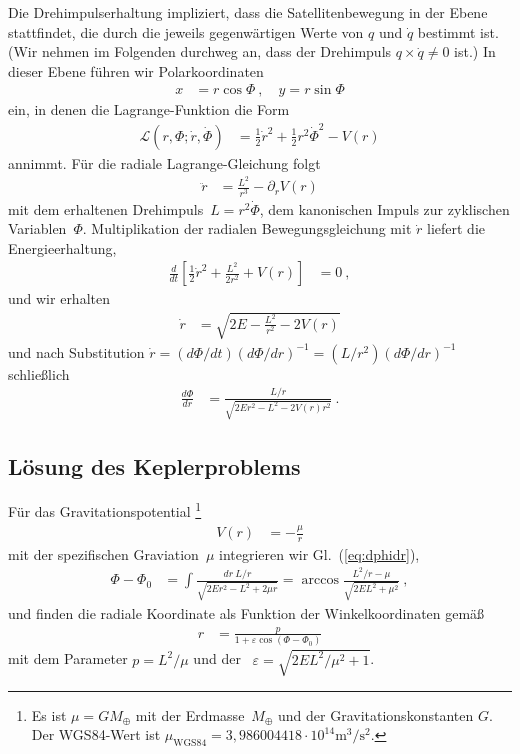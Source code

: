 \documentclass[10pt,a4paper]{article}
\newcommand{\mydef}[1]{\textls{#1}}
\begin{document}
Die Drehimpuls\-erhaltung impliziert, dass die Satellitenbewegung in der Ebene stattfindet, die durch die jeweils gegenwärtigen Werte von $q$ und $\dot{q}$ bestimmt ist.
(Wir nehmen im Folgenden durchweg an, dass der Drehimpuls $q\times\dot{q}\neq 0$ ist.)
In dieser Ebene führen wir Polarkoordinaten
\begin{align}
	\label{eq:polar_coord}
	x &= r \cos\Phi\ ,\quad y = r \sin\Phi
\end{align}
ein, in denen die Lagrange-Funktion die Form
\begin{align}
	\mathcal{L}(r, \Phi; \dot{r}, \dot{\Phi}) &=
	\frac{1}{2} \dot{r}^2 + 
	\frac{1}{2} r^2\dot{\Phi}^2 - V(r)
\end{align}
annimmt.
Für die radiale Lagrange-Gleichung folgt
\begin{align}
	\ddot{r} &=	 
	\frac{L^2}{r^3} - \partial_rV(r)	
\end{align}
mit dem erhaltenen Drehimpuls~$L=r^2\dot{\Phi}$, dem kanonischen Impuls zur zyklischen Variablen~$\Phi$.
Multiplikation der radialen Bewegungsgleichung mit $\dot{r}$ liefert die Energieerhaltung,
\begin{align}
	\frac{d}{dt}\left[
		\frac{1}{2} \dot{r}^2
		+ \frac{L^2}{2r^2} + V(r)
	\right] &= 0
	\ ,
\end{align}
und wir erhalten
\begin{align}
	\dot{r}& = \sqrt{2 E - \frac{L^2}{r^2} - 2 V(r)}
\end{align}
und nach Substitution $\dot{r}=(d\Phi/dt)(d\Phi/dr)^{-1}=(L/r^2)(d\Phi/dr)^{-1}$ schließlich
\begin{align}
	\label{eq:dphidr}
	\frac{d\Phi}{dr} &= \frac{L/r}{\sqrt{2 E r^{2} - L^2 - 2 V(r) r^{2}}}
	\ .
\end{align}

\subsection{Lösung des Keplerproblems}
\label{ssec:kepler_solution}

Für das Gravitationspotential
\footnote{Es ist $\mu = G M_\oplus$ mit der Erdmasse~$M_\oplus$ und der Gravitationskonstanten $G$. Der WGS84-Wert ist $\mu_{\mathrm{WGS}84} = 3,986004418\cdot 10^{14} \mathrm{m^3/s^2}$.}
\begin{align}
	V(r) &= -\frac{\mu}{r}
\end{align}
mit der spezifischen Graviation~$\mu$ integrieren wir Gl.~(\ref{eq:dphidr}),
\begin{align}
	\Phi - \Phi_0 &=
	\int \frac{dr\ L/r}{\sqrt{2 E r^{2} - L^2 + 2 \mu r}}
	= \arccos\frac{L^2/r - \mu}
		{\sqrt{2EL^2 + \mu^2}}
	\ ,
\end{align}
und finden die radiale Koordinate als Funktion der Winkel\-koordinaten gemäß
\begin{align}
	\label{eq:focal_eq_conic}
	r &= \frac{p}{1 + \varepsilon \cos(\Phi - \Phi_0)}
\end{align}
mit dem Parameter $p=L^2/\mu$ und der \mydef{Exzentrizität}~$\varepsilon=\sqrt{2EL^2/\mu^2+1}$.
\end{document}
